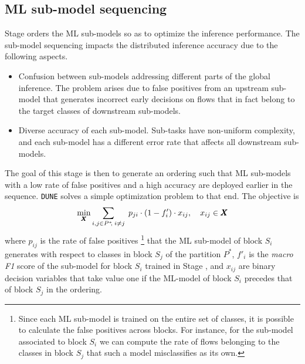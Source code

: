 \documentclass[journal]{IEEEtran}
\theoremstyle{plain} %
\newcommand*\numO[1]{\raisebox{.5pt}{\textcircled{\raisebox{-.9pt} {#1}}}}
\newcommand{\name}{\texttt{\fontsize{9}{11}\selectfont DUNE}\xspace}
\begin{document}
\subsection{ML sub-model sequencing}
\label{sub:sequencing}

Stage \numO{5} orders the ML sub-models so as to optimize the inference performance. The sub-model sequencing impacts the distributed inference accuracy due to the following aspects.
\begin{itemize}
    \item Confusion between sub-models addressing different parts of the global inference. The problem arises due to false positives from an upstream sub-model that generates incorrect early decisions on flows that in fact belong to the target classes of downstream sub-models.
    \item Diverse accuracy of each sub-model. Sub-tasks have non-uniform complexity, and each sub-model has a different error rate that affects all downstream sub-models.
\end{itemize}
The goal of this stage is then to generate an ordering such that ML sub-models with a low rate of false positives and a high accuracy are deployed earlier in the sequence. \name solves a simple optimization problem to that end. The objective is
\begin{equation}
\min_{\pmb{X}} \sum_{i,j\in P^*\hspace*{-2pt},\;i\neq j} \; p_{ji} \cdot (1 - f'_{i}) \cdot x_{ij}, \quad x_{ij}\in\pmb{X}
\label{eq:seq-objective}
\end{equation}
where $p_{ij}$ is the rate of false positives%
\footnote{Since each ML sub-model is trained on the entire set of classes, it is possible to calculate the false positives across blocks. For instance, for the sub-model associated to block $S_i$ we can compute the rate of flows belonging to the classes in block $S_j$ that such a model misclassifies as its own.}
that the ML sub-model of block $S_i$ generates with respect to classes in block $S_j$ of the partition $P^*$, $f'_i$ is the \textit{macro F1} score of the sub-model for block $S_i$ trained in Stage \numO{3}, and $x_{ij}$ are binary decision variables that take value one if the ML-model of block $S_i$ precedes that of block $S_j$ in the ordering.
\end{document}
